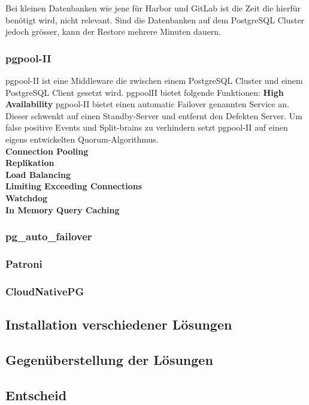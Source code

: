 Bei kleinen Datenbanken wie jene für \Gls{Harbor} und \Gls{GitLab} ist die Zeit die hierfür benötigt wird, nicht relevant.
Sind die Datenbanken auf dem \Gls{PostgreSQL Cluster} jedoch grösser, kann der Restore mehrere Minuten dauern.
\subsubsection{pgpool-II}
pgpool-II ist eine Middleware die zwischen einem \Gls{PostgreSQL Cluster} und einem PostgreSQL Client gesetzt wird.
pgpoolII bietet folgende Funktionen\cite{EXVNLICT,3XWCD3KX}:
\textbf{High Availability}
pgpool-II bietet einen automatic \Gls{Failover} genannten Service an.
Dieser schwenkt auf einen Standby-Server und entfernt den Defekten Server.
Um false positive Events und Split-brains zu verhindern setzt pgpool-II auf einen eigens entwickelten \Gls{Quorum}-Algorithmus.
\\\textbf{Connection Pooling}
\\\textbf{Replikation}
\\\textbf{Load Balancing}
\\\textbf{Limiting Exceeding Connections}
\\\textbf{Watchdog}
\\\textbf{In Memory Query Caching}

\subsubsection{pg\_auto\_failover}
\subsubsection{Patroni}
\subsubsection{CloudNativePG}
\subsection{Installation verschiedener Lösungen}
\subsection{Gegenüberstellung der Lösungen}
\subsection{Entscheid}